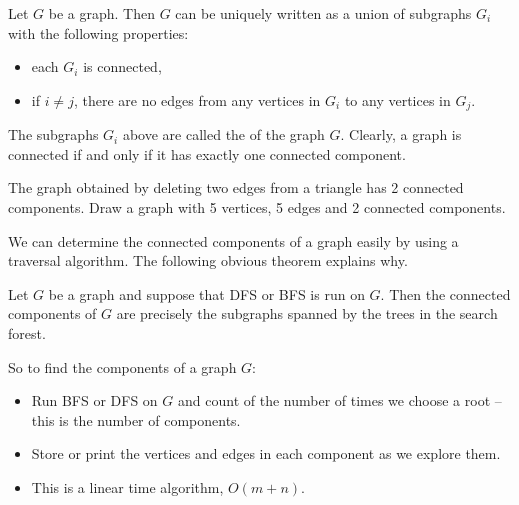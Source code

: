 \begin{Theorem} \label{thm:components}
Let $G$ be a graph. Then $G$ can be uniquely written as a union of
subgraphs $G_i$ with the following properties:
\begin{itemize}
  \item each $G_i$ is connected,
  \item if $i \neq j$, there are no edges from any vertices in $G_i$ 
  to any vertices in $G_j$.
\end{itemize}
\end{Theorem}

The subgraphs $G_i$ above are called the  of the graph $G$. 
Clearly, a graph is connected if and only if it has exactly one connected component.

\begin{Boxample}[2] \label{eg:components}
The graph obtained by deleting two edges from a triangle has 2 connected components. Draw a graph with 5 vertices, 5 edges and 2 connected components.
\end{Boxample}

We can determine the connected components of a graph easily by using a
traversal algorithm. The following obvious theorem explains why.

\begin{Theorem} \label{thm:trav-comps}
Let $G$ be a graph and suppose that DFS or BFS is run on $G$. Then the
connected components of $G$ are precisely the subgraphs spanned by the
trees in the search forest. 
\end{Theorem}

So to find the components of a graph $G$:
\begin{itemize}
\item Run BFS or DFS on $G$ and count of the number of times we choose a root -- this is the number of components.
\item Store or print the vertices and edges in each component as we explore them.
\item This is a linear time algorithm, $O(m+n)$.
\end{itemize}

